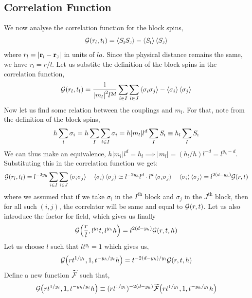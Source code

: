 \subsection{Correlation Function}
We now analyse the correlation function for the block spins, 
$$\mathcal G(r_l, t_l) = \left\langle S_{\text{\tiny I}}S_{\text{\tiny J}} \right\rangle - \left\langle S_{\text{\tiny I}} \right\rangle\left\langle S_{\text{\tiny J}} \right\rangle$$
where $r_l = \abs{\vb{r}_{\text{\tiny I}}-\vb{r}_{\text{\tiny J}}}$ in units of $la$. Since the physical distance remains the same, we have $r_l = r/l$. Let us substite the definition of the block spins in the correlation function,
\begin{align}
    \begin{split}
        \mathcal G(r_l, t_l)= \frac{1}{\abs{m_l}^2 l^{2d}} \sum\limits_{i\in I } \sum\limits_{i\in J } \left\langle \sigma_i \sigma_j \right\rangle - \left\langle \sigma_i \right\rangle\left\langle \sigma_j \right\rangle
    \end{split}
\end{align}
Now let us find some relation between the couplings and $m_l$. For that, note from the definition of the block spins,
\begin{align*}
    h\sum\limits_i\sigma_i = h \sum\limits_{I}\sum\limits_{i\in I} \sigma_i = h|m_l| l^d  \sum\limits_{I} S_{\text{\tiny I}}  \equiv h_l \sum\limits_{I} S_{\text{\tiny I}}
\end{align*}
We can thus make an equivalence, $h|m_l| l^d = h_l \implies |m_l| = (h_l/h)l^{-d} = l^{y_h-d}$. Substituting this in the correlation function we get:
\begin{align*}
    \mathcal G(r_l, t_l)= l^{-2y_h} \sum\limits_{i\in I } \sum\limits_{i\in J } \left\langle \sigma_i \sigma_j \right\rangle - \left\langle \sigma_i \right\rangle\left\langle \sigma_j \right\rangle\simeq  l^{-2y_h} l^d \cdot l^d \left\langle \sigma_i \sigma_j \right\rangle - \left\langle \sigma_i \right\rangle\left\langle \sigma_j \right\rangle = l^{2(d-y_h)}\mathcal G(r,t)
\end{align*} 
where we assumed that if we take $\sigma_i$ in the $I^{\text{th}}$ block and $\sigma_j$ in the $J^{\text{th}}$ block, then for all such $(i,j)$, the correlator will be same and equal to $\mathcal G(r,t)$. Let us also introduce the factor for field, which gives us finally 
\begin{equation*}
    \mathcal G\qty(\frac{r}{l}, l^{y_t}t, l^{y_h}h) = l^{2(d-y_h)}\mathcal G(r,t,h)
\end{equation*}
Let us choose $l$ such that $lt^{y_t}=1$ which gives us, 
\begin{equation*}
     \mathcal G\qty(rt^{1/y_t},1, t^{-y_h/y_t}h) = t^{-2(d-y_h)/y_t}\mathcal G(r,t,h)  
\end{equation*}
Define a new function $\widetilde{\mathcal F}$ such that, 
$$ \mathcal G\qty(rt^{1/y_t},1, t^{-y_h/y_t}h) \equiv (rt^{1/y_t})^{-2(d-y_h)} \widetilde{\mathcal F}\qty(rt^{1/y_t},1, t^{-y_h/y_t}h)$$
